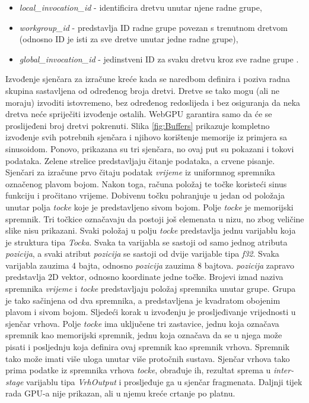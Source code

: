 \documentclass{foi}
\begin{document}
\begin{itemize}
	\item \textit{local\_invocation\_id} - identificira dretvu unutar njene radne grupe,
	\item \textit{workgroup\_id} - predstavlja ID radne grupe povezan s trenutnom dretvom (odnosno ID je isti za sve dretve unutar jedne radne grupe),
	\item \textit{global\_invocation\_id} - jedinstveni ID za svaku dretvu kroz sve radne grupe \parencite{WebGPUFundamentalsMemoryLayout}.
\end{itemize}
Izvođenje sjenčara za izračune kreće kada se naredbom definira i poziva radna skupina sastavljena od određenog broja dretvi. Dretve se tako mogu (ali ne moraju) izvoditi istovremeno, bez određenog redoslijeda i bez osiguranja da neka dretva neće spriječiti izvođenje ostalih. WebGPU garantira samo da će se proslijeđeni broj dretvi pokrenuti. Slika \ref{fig:Buffers} prikazuje kompletno izvođenje svih potrebnih sjenčara i njihovo korištenje memorije iz primjera sa sinusoidom. Ponovo, prikazana su tri sjenčara, no ovaj put su pokazani i tokovi podataka. Zelene strelice predstavljaju čitanje podataka, a crvene pisanje. Sjenčari za izračune prvo čitaju podatak \textit{vrijeme} iz uniformnog spremnika označenog plavom bojom. Nakon toga, računa položaj te točke koristeći sinus funkciju i pročitano vrijeme. Dobivenu točku pohranjuje u jedan od položaja unutar polja \textit{tocke} koje je predstavljeno sivom bojom. Polje \textit{tocke} je memorijski spremnik. Tri točkice označavaju da postoji još elemenata u nizu, no zbog veličine slike nisu prikazani. Svaki položaj u polju \textit{tocke} predstavlja jednu varijablu koja je struktura tipa \textit{Tocka}. Svaka ta varijabla se sastoji od samo jednog atributa \textit{pozicija}, a svaki atribut \textit{pozicija} se sastoji od dvije varijable tipa \textit{f32}. Svaka varijabla zauzima 4 bajta, odnosno \textit{pozicija} zauzima 8 bajtova. \textit{pozicija} zapravo predstavlja 2D vektor, odnosno koordinate jedne točke. Brojevi iznad naziva spremnika \textit{vrijeme} i \textit{tocke} predstavljaju položaj spremnika unutar grupe. Grupa je tako sačinjena od dva spremnika, a predstavljena je kvadratom obojenim plavom i sivom bojom. Sljedeći korak u izvođenju je prosljeđivanje vrijednosti u sjenčar vrhova. Polje \textit{tocke} ima uključene tri zastavice, jednu koja označava spremnik kao memorijski spremnik, jednu koja označava da se u njega može pisati i posljednju koja definira ovaj spremnik kao spremnik vrhova. Spremnik tako može imati više uloga unutar više protočnih sustava. Sjenčar vrhova tako prima podatke iz spremnika vrhova \textit{tocke}, obrađuje ih, rezultat sprema u \textit{inter-stage} varijablu tipa \textit{VrhOutput} i prosljeđuje ga u sjenčar fragmenata. Daljnji tijek rada GPU-a nije prikazan, ali u njemu kreće crtanje po platnu.
\end{document}
